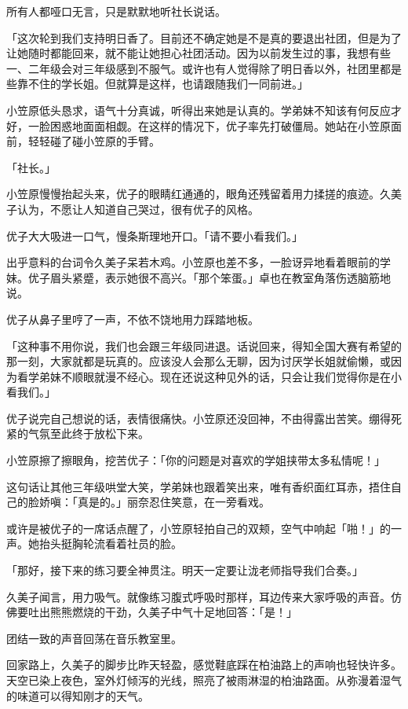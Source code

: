 \documentclass[UTF8]{ctexart}
\begin{document}
    所有人都哑口无言，只是默默地听社长说话。 

    「这次轮到我们支持明日香了。目前还不确定她是不是真的要退出社团，但是为了让她随时都能回来，就不能让她担心社团活动。因为以前发生过的事，我想有些一、二年级会对三年级感到不服气。或许也有人觉得除了明日香以外，社团里都是些靠不住的学长姐。但就算是这样，也请跟随我们一同前进。」 

    小笠原低头恳求，语气十分真诚，听得出来她是认真的。学弟妹不知该有何反应才好，一脸困惑地面面相觑。在这样的情况下，优子率先打破僵局。她站在小笠原面前，轻轻碰了碰小笠原的手臂。 

    「社长。」 

    小笠原慢慢抬起头来，优子的眼睛红通通的，眼角还残留着用力揉搓的痕迹。久美子认为，不愿让人知道自己哭过，很有优子的风格。 

    优子大大吸进一口气，慢条斯理地开口。「请不要小看我们。」 

    出乎意料的台词令久美子呆若木鸡。小笠原也差不多，一脸讶异地看着眼前的学妹。优子眉头紧蹙，表示她很不高兴。「那个笨蛋。」卓也在教室角落伤透脑筋地说。 

    优子从鼻子里哼了一声，不依不饶地用力踩踏地板。 

    「这种事不用你说，我们也会跟三年级同进退。话说回来，得知全国大赛有希望的那一刻，大家就都是玩真的。应该没人会那么无聊，因为讨厌学长姐就偷懒，或因为看学弟妹不顺眼就漫不经心。现在还说这种见外的话，只会让我们觉得你是在小看我们。」 

    优子说完自己想说的话，表情很痛快。小笠原还没回神，不由得露出苦笑。绷得死紧的气氛至此终于放松下来。 

    小笠原擦了擦眼角，挖苦优子：「你的问题是对喜欢的学姐挟带太多私情呢！」 

    这句话让其他三年级哄堂大笑，学弟妹也跟着笑出来，唯有香织面红耳赤，捂住自己的脸娇嗔：「真是的。」丽奈忍住笑意，在一旁看戏。 

    或许是被优子的一席话点醒了，小笠原轻拍自己的双颊，空气中响起「啪！」的一声。她抬头挺胸轮流看着社员的脸。 

    「那好，接下来的练习要全神贯注。明天一定要让泷老师指导我们合奏。」 

    久美子闻言，用力吸气。就像练习腹式呼吸时那样，耳边传来大家呼吸的声音。仿佛要吐出熊熊燃烧的干劲，久美子中气十足地回答：「是！」 

    团结一致的声音回荡在音乐教室里。 

    回家路上，久美子的脚步比昨天轻盈，感觉鞋底踩在柏油路上的声响也轻快许多。天空已染上夜色，室外灯倾泻的光线，照亮了被雨淋湿的柏油路面。从弥漫着湿气的味道可以得知刚才的天气。 
\end{document}
